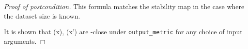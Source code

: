 \documentclass{article}
\begin{document}
\begin{proof}[Proof of postcondition]
    This formula matches the stability map in the case where the dataset size is known.

    It is shown that \function(x), \function(x') are \dout-close under \texttt{output\_metric} for any choice of input arguments.
\end{proof}
\end{document}

